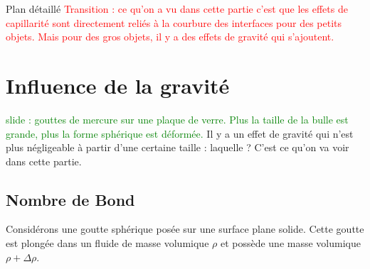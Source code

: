 \begin{reportBlock}{Plan détaillé}
\textcolor{red}{Transition : ce qu'on a vu dans cette partie c'est que les effets de capillarité sont directement reliés à la courbure des interfaces pour des petits objets. Mais pour des gros objets, il y a des effets de gravité qui s'ajoutent.}

  \section{Influence de la gravité}
  
  \textcolor{green}{slide : gouttes de mercure sur une plaque de verre. Plus la taille de la bulle est grande, plus la forme sphérique est déformée.}
  Il y a un effet de gravité qui n'est plus négligeable à partir d'une certaine taille : laquelle ? C'est ce qu'on va voir dans cette partie.
  
  \subsection{Nombre de Bond}
  Considérons une goutte sphérique posée sur une surface plane solide. Cette goutte est plongée dans un fluide de masse volumique $\rho$ et possède une masse volumique $\rho+\Delta\rho$.\\
  

\end{reportBlock}
